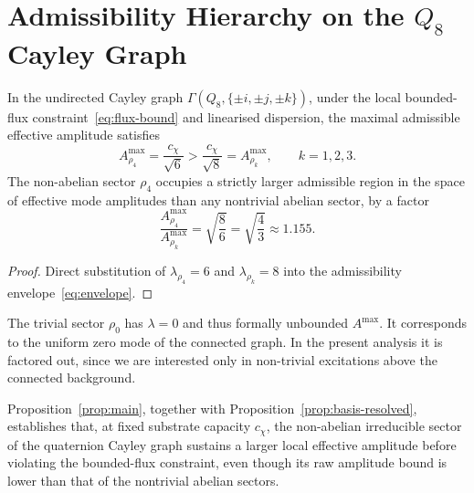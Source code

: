 \section{Admissibility Hierarchy on the $Q_8$ Cayley Graph}
  \label{sec:admissibility-hierarchy-on-the-q_8-cayley-graph}

  \begin{proposition}
    \label{prop:main}
    In the undirected Cayley graph $\Gamma(Q_8, \{\pm i, \pm j, \pm k\})$,
    under the local bounded-flux constraint~\eqref{eq:flux-bound} and linearised
    dispersion, the maximal admissible effective amplitude satisfies
    \begin{equation}
      A^{\max}_{\rho_4} = \frac{c_\chi}{\sqrt{6}}
      >
      \frac{c_\chi}{\sqrt{8}}
      = A^{\max}_{\rho_k},
      \qquad
      k = 1,2,3.
    \end{equation}
    The non-abelian sector $\rho_4$ occupies a strictly larger admissible region in the
    space of effective mode amplitudes than any nontrivial abelian sector, by a factor
    \begin{equation}
      \frac{A^{\max}_{\rho_4}}{A^{\max}_{\rho_k}}
      =
      \sqrt{\frac{8}{6}}
      =
      \sqrt{\frac{4}{3}}
      \approx 1.155.
    \end{equation}
  \end{proposition}

  \begin{proof}
    Direct substitution of $\lambda_{\rho_4} = 6$ and $\lambda_{\rho_k} = 8$
    into the admissibility envelope~\eqref{eq:envelope}.
  \end{proof}

  \begin{remark}
    The trivial sector $\rho_0$ has $\lambda = 0$ and thus formally unbounded $A^{\max}$.
    It corresponds to the uniform zero mode of the connected graph.
    In the present analysis it is factored out, since we are interested only in
    non-trivial excitations above the connected background.
  \end{remark}

  Proposition~\ref{prop:main}, together with
  Proposition~\ref{prop:basis-resolved}, establishes that, at fixed substrate capacity
  $c_\chi$, the non-abelian irreducible sector of the quaternion Cayley graph sustains
  a larger local effective amplitude before violating the bounded-flux constraint,
  even though its raw amplitude bound is lower than that of the nontrivial abelian
  sectors.

